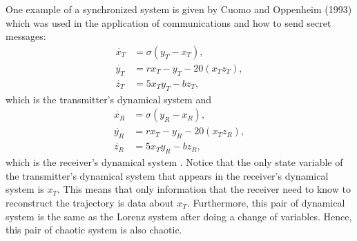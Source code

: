 \documentclass[12pt]{article}
\begin{document}
      One example of a synchronized system is given by Cuomo and Oppenheim (1993) which was used in the application of communications and how to send secret messages: 
      \begin{equation}\label{eq:transmitter}
      \begin{aligned}
        \dot{x_T} &= \sigma (y_T-x_T), \\
        \dot{y_T} &= r  x_T - y_T - 20 (x_T   z_T),\\
        \dot{z_T} &= 5 x_T y_T - b  z_T,
      \end{aligned}
    \end{equation} 
    which is the transmitter's dynamical system and 
    \begin{equation}\label{eq:receiver}
      \begin{aligned}
        \dot{x_R} &= \sigma (y_R-x_R), \\
        \dot{y_R} &= r  x_T - y_R - 20 (x_T   z_R),\\
        \dot{z_R} &= 5 x_T y_R - b  z_R,
      \end{aligned}
    \end{equation}
    which is the receiver's dynamical system \cite{cuomo1993}. Notice that the only state variable of the transmitter's dynamical system that appears in the receiver's dynamical system is $x_T$. This means that only information that the receiver need to know to reconstruct the trajectory is data about $x_T$. Furthermore, this pair of dynamical system is the same as the Lorenz system after doing a change of variables. Hence, this pair of chaotic system is also chaotic. 
\end{document}
